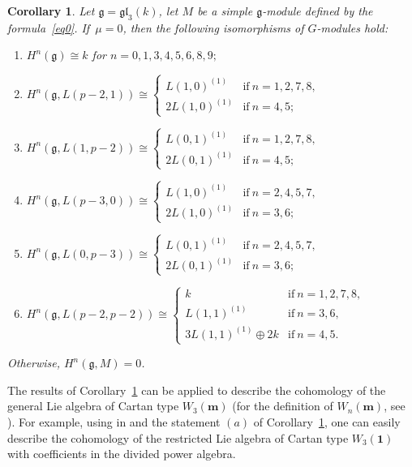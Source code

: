 \documentclass[pdftex]{sigma}%
\numberwithin{equation}{section}
\newtheorem{Corollary}[Theorem]{Corollary}
\begin{document}
\begin{Corollary}\label{c1}
Let $\mathfrak{g}=\mathfrak{gl}_3(k)$, let $M$ be a simple $\mathfrak{g}$-module defined by the formula~\eqref{eq0}. If~$\mu=0$, then the following isomorphisms of $G$-modules hold:

\begin{enumerate}\itemsep=0pt

\item[$(a)$] $H^n(\mathfrak{g})\cong k$ for $n=0,1,3,4,5,6,8,9;$

\item[$(b)$] $H^n(\mathfrak{g},L(p-2,1))\cong
\begin{cases}
L(1,0)^{(1)}&\text{if}\ n=1,2,7,8,
\\
2L(1,0)^{(1)}&\text{if}\ n=4,5;
\end{cases}$

\item[$(c)$] $H^n(\mathfrak{g},L(1,p-2))\cong
\begin{cases}
L(0,1)^{(1)}&\text{if}\ n=1,2,7,8,
\\
2L(0,1)^{(1)}&\text{if}\ n=4,5;
\end{cases}$

\item[$(d)$] $H^n(\mathfrak{g},L(p-3,0))\cong
\begin{cases}
L(1,0)^{(1)}&\text{if}\ n=2,4,5,7,
\\
2L(1,0)^{(1)}&\text{if}\ n=3,6;
\end{cases}$

\item[$(e)$] $H^n(\mathfrak{g},L(0,p-3))\cong
\begin{cases}
L(0,1)^{(1)}&\text{if}\ n=2,4,5,7,
\\
2L(0,1)^{(1)}&\text{if}\ n=3,6;
\end{cases}$

\item[$(f)$] $H^n(\mathfrak{g},L(p-2,p-2))\cong
\begin{cases}
k&\text{if} \ n=1,2,7,8,\\
L(1,1)^{(1)}&\text{if}\ n=3,6,\\
3L(1,1)^{(1)}\oplus 2k&\text{if}\ n=4,5.
\end{cases}$
\end{enumerate}
Otherwise, $H^n(\mathfrak{g},M)=0$.
\end{Corollary}

The results of Corollary~\ref{c1} can be applied to describe the cohomology of the general Lie algebra of Cartan type $W_3(\mathbf{m})$ (for the definition of $W_n(\mathbf{m})$, see \cite[Section~1.3]{IT21}). For example, using in \cite[Theorem~0.2]{BY17} and the statement $(a)$ of Corollary~\ref{c1}, one can easily describe the cohomology of the restricted Lie algebra of Cartan type $W_3(\mathbf{1})$ with coefficients in the divided power algebra.
\end{document}

